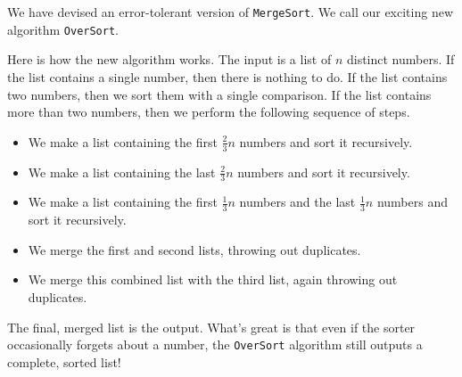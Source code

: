 \documentclass[12pt]{article}
\begin{document}
We have devised an error-tolerant version of {\tt MergeSort}.  We call
our exciting new algorithm {\tt OverSort}.

Here is how the new algorithm works.  The input is a list of $n$
distinct numbers.  If the list contains a single number, then there is
nothing to do.  If the list contains two numbers, then we sort them
with a single comparison.  If the list contains more than two numbers,
then we perform the following sequence of steps.

\begin{itemize}
\item We make a list containing the first $\frac{2}{3}n$
numbers and sort it recursively.

\item We make a list containing the last $\frac{2}{3}n$ numbers
and sort it recursively.

\item We make a list containing the first $\frac{1}{3}n$ numbers and
the last $\frac{1}{3}n$ numbers and sort it recursively.

\item We merge the first and second lists, throwing out duplicates.

\item We merge this combined list with the third list, again throwing out
duplicates.
\end{itemize}

The final, merged list is the output.  What's great is that even if
the sorter occasionally forgets about a number, the {\tt OverSort}
algorithm still outputs a complete, sorted list!
\end{document}
